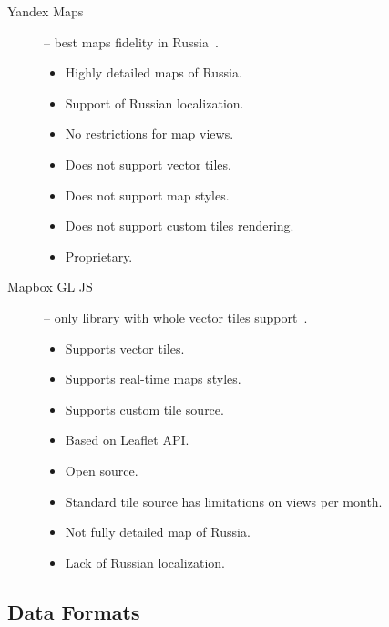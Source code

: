 \begin{description}
  \item[Yandex Maps] -- best maps fidelity in Russia~\cite{yandex:maps}. \\
    \underline{}
    \begin{itemize}
      \item Highly detailed maps of Russia.
      \item Support of Russian localization.
      \item No restrictions for map views.
    \end{itemize}

    \underline{}
    \begin{itemize}
      \item Does not support vector tiles.
      \item Does not support map styles.
      \item Does not support custom tiles rendering.
      \item Proprietary.
    \end{itemize}

  \item[Mapbox GL JS] -- only library with whole vector tiles support~\cite{gh:mapboxgljs}. \\
    \underline{}
    \begin{itemize}
      \item Supports vector tiles.
      \item Supports real-time maps styles.
      \item Supports custom tile source.
      \item Based on Leaflet API.
      \item Open source.
    \end{itemize}

    \underline{}
    \begin{itemize}
      \item Standard tile source has limitations on views per month.
      \item Not fully detailed map of Russia.
      \item Lack of Russian localization.
    \end{itemize}
\end{description}

\subsection{Data Formats}

